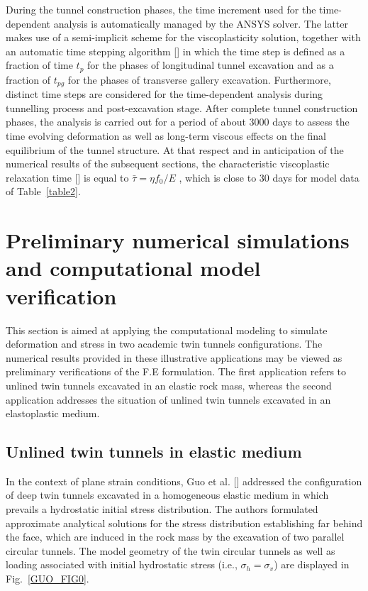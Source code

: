 \documentclass[a4paper,fleqn]{cas-sc}
\begin{document}
\FloatBarrier
During the tunnel construction phases, the time increment used for the time-dependent analysis is automatically managed by the ANSYS solver. The latter makes use of a semi-implicit scheme for the viscoplasticity solution, together with an automatic time stepping algorithm [] in which the time step is defined as a fraction of time $t_p$ for the phases of longitudinal tunnel excavation and as a fraction of $t_{pg}$ for the phases of transverse gallery excavation. Furthermore, distinct time steps are considered for the time-dependent analysis during tunnelling process and post-excavation stage. After complete tunnel construction phases, the analysis is carried out for a period of about $3000$ days to assess the time evolving deformation as well as long-term viscous effects on the final equilibrium of the tunnel structure. At that respect and in anticipation of the numerical results of the subsequent sections, the characteristic viscoplastic relaxation time [] is equal to $\bar{\tau} = \eta f_0 / E$ , which is close to $30$ days for model data of Table~\ref{table2}.

\section{Preliminary numerical simulations and computational model verification}\label{sec6}

This section is aimed at applying the computational modeling to simulate deformation and stress in two academic twin tunnels configurations. The numerical results provided in these illustrative applications may be viewed as preliminary verifications of the F.E formulation. The first application refers to unlined twin tunnels excavated in an elastic rock mass, whereas the second application addresses the situation of unlined twin tunnels excavated in an elastoplastic medium.

\subsection{Unlined twin tunnels in elastic medium}

In the context of plane strain conditions, Guo et al. [] addressed the configuration of deep twin tunnels excavated in a homogeneous elastic medium in which prevails a hydrostatic initial stress distribution. The authors formulated approximate analytical solutions for the stress distribution establishing far behind the face, which are induced in the rock mass by the excavation of two parallel circular tunnels. The model geometry of the twin circular tunnels as well as loading associated with initial hydrostatic stress (i.e., $\sigma_h = \sigma_v$) are displayed in Fig.~\ref{GUO_FIG0}.
\end{document}
